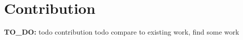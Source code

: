 \section{Contribution}
\textbf{TO\_DO:}
todo contribution
todo compare to existing work, find some work 


